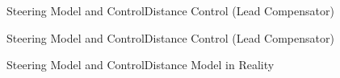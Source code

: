 \begin{frame}{Steering Model and Control}{Distance Control (Lead Compensator)}
  \begin{figure}[H]
    \centering
  \end{figure}
\end{frame}


\begin{frame}{Steering Model and Control}{Distance Control (Lead Compensator)}
  \begin{figure}[H]
    \centering
  \end{figure}
\end{frame}

\begin{frame}{Steering Model and Control}{Distance Model in Reality}
    \begin{minipage}{\linewidth}
    \begin{minipage}{0.45\linewidth}
      \begin{figure}[H]
        \centering
      \end{figure}
    \end{minipage}
    \hspace{0.03\linewidth}
    \begin{minipage}{0.45\linewidth}
      \begin{figure}[H]
        \centering
      \end{figure}
    \end{minipage}
  \end{minipage}
\end{frame}